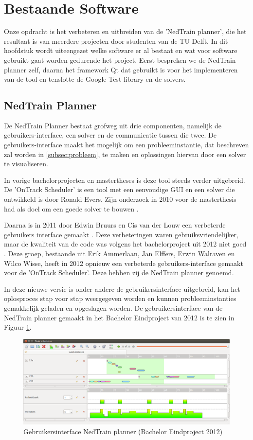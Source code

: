 \section{Bestaande Software}
Onze opdracht is het verbeteren en uitbreiden van de 'NedTrain planner', die het resultaat is van meerdere projecten door studenten van de TU Delft. In dit hoofdstuk wordt uiteengezet welke software er al bestaat en wat voor software gebruikt gaat worden gedurende het project. Eerst bespreken we de NedTrain planner zelf, daarna het framework Qt dat gebruikt is voor het implementeren van de tool en tenslotte de Google Test library en de solvers.

\subsection{NedTrain Planner}
\label{subsec:planner}
De NedTrain Planner bestaat grofweg uit drie componenten, namelijk de gebruikers-interface, een solver en de communicatie tussen die twee. De gebruikers-interface maakt het mogelijk om een probleeminstantie, dat beschreven zal worden in \ref{subsec:probleem}, te maken en oplossingen hiervan door een solver te visualiseren.

In vorige bachelorprojecten en mastertheses is deze tool steeds verder uitgebreid. De 'OnTrack Scheduler' is een tool met een eenvoudige GUI en een solver die ontwikkeld is door Ronald Evers. Zijn onderzoek in 2010 voor de masterthesis had als doel om een goede solver te bouwen \cite{ronaldevers2010}.

Daarna is in 2011 door Edwin Bruurs en Cis van der Louw een verbeterde gebruikers interface gemaakt \cite{bep2011nedtrain}. Deze verbeteringen waren gebruiksvriendelijker, maar de kwaliteit van de code was volgens het bachelorproject uit 2012 niet goed \cite{bep2012nedtrain}. Deze groep, bestaande uit Erik Ammerlaan, Jan Elffers, Erwin Walraven en Wilco Wisse, heeft in 2012 opnieuw een verbeterde gebruikers-interface gemaakt voor de 'OnTrack Scheduler'. Deze hebben zij de NedTrain planner genoemd.

In deze nieuwe versie is onder andere de gebruikersinterface uitgebreid, kan het oplosproces stap voor stap weergegeven worden en kunnen probleeminstanties gemakkelijk geladen en opgeslagen worden. De gebruikersinterface van de NedTrain planner gemaakt in het Bachelor Eindproject van 2012 is te zien in Figuur \ref{fig:plannergui}.

\begin{figure}[!h]
\label{fig:plannergui}
\centering
\includegraphics[width=\textwidth]{../images/plannergui.png}
\caption{Gebruikersinterface NedTrain planner (Bachelor Eindproject 2012)}
\end{figure}

